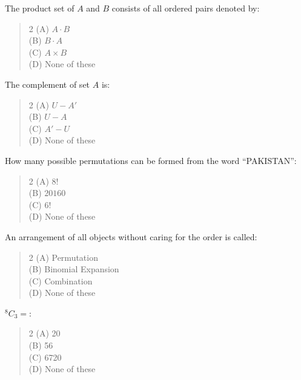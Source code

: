 \documentclass[11pt,a4paper]{article}
\begin{document}
\begin{mcqlist}
\item The product set of $A$ and $B$ consists of all ordered pairs denoted by:
\begin{quote}\begin{multicols}{2}
\noindent (A) $A\cdot B$ \\
(B) $B\cdot A$ \\
(C) $A\times B$ \\
(D) None of these
\end{multicols}\end{quote}

\item The complement of set $A$ is:
\begin{quote}\begin{multicols}{2}
\noindent (A) $U-A'$ \\
(B) $U-A$ \\
(C) $A'-U$ \\
(D) None of these
\end{multicols}\end{quote}

\item How many possible permutations can be formed from the word ``PAKISTAN'':
\begin{quote}\begin{multicols}{2}
\noindent (A) $8!$ \\
(B) $20160$ \\
(C) $6!$ \\
(D) None of these
\end{multicols}\end{quote}

\item An arrangement of all objects without caring for the order is called:
\begin{quote}\begin{multicols}{2}
\noindent (A) Permutation \\
(B) Binomial Expansion \\
(C) Combination \\
(D) None of these
\end{multicols}\end{quote}

\item ${}^{8}C_3=$\underline{\hspace{1cm}}:
\begin{quote}\begin{multicols}{2}
\noindent (A) 20 \\
(B) 56 \\
(C) 6720 \\
(D) None of these
\end{multicols}\end{quote}


\end{mcqlist}
\end{document}
